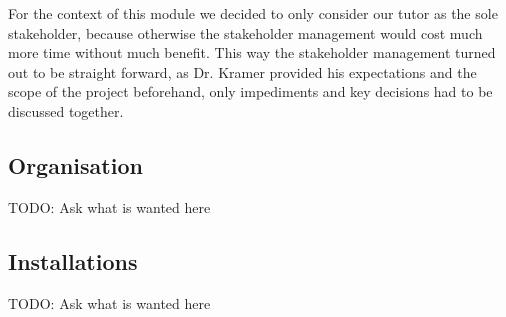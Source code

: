 For the context of this module we decided to only consider our tutor as the sole stakeholder,
because otherwise the stakeholder management would cost much more time without much benefit.
This way the stakeholder management turned out to be straight forward, as Dr. Kramer provided his expectations and the
scope of the project beforehand, only impediments and key decisions had to be discussed together.

\subsection{Organisation}\label{subsec:organisation}
TODO: Ask what is wanted here

\subsection{Installations}\label{subsec:installations}
TODO: Ask what is wanted here
